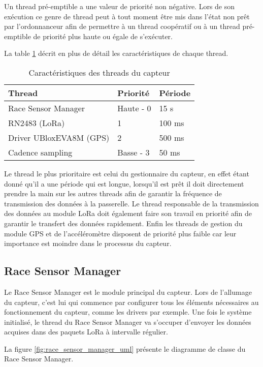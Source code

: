 Un thread pré-emptible a une valeur de priorité non négative. Lors de son exécution ce genre de thread peut à tout moment être mis dans l'état non prêt par l'ordonnanceur afin de permettre à un thread coopératif ou à un thread pré-emptible de priorité plus haute ou égale de s'exécuter. \cite{zephyr_web}

La table \ref{tab:threads_cara} décrit en plus de détail les caractéristiques de chaque thread.

\begin{table}[htb]
\caption{Caractéristiques des threads du capteur}
\label{tab:threads_cara}
\centering
\begin{tabular}{ l l l }
\toprule
Thread & Priorité & Période \\
\midrule
Race Sensor Manager & Haute - 0 & 15 s  \\
RN2483 (LoRa) & 1 & 100 ms  \\
Driver UBloxEVA8M (GPS) & 2 & 500 ms  \\
Cadence sampling & Basse - 3 & 50 ms  \\
\bottomrule 
\end{tabular}
\end{table}

Le thread le plus prioritaire est celui du gestionnaire du capteur, en effet étant donné qu'il a une période qui est longue, lorsqu'il est prêt il doit directement prendre la main sur les autres threads afin de garantir la fréquence de transmission des données à la passerelle.
Le thread responsable de la transmission des données au module LoRa doit également faire son travail en priorité afin de garantir le transfert des données rapidement.
Enfin les threads de gestion du module GPS et de l'accéléromètre disposent de priorité plus faible car leur importance est moindre dans le processus du capteur.

\subsection{Race Sensor Manager}

Le Race Sensor Manager est le module principal du capteur. Lors de l'allumage du capteur, c'est lui qui commence par configurer tous les éléments nécessaires au fonctionnement du capteur, comme les drivers par exemple. Une fois le système initialisé, le thread du Race Sensor Manager va s'occuper d'envoyer les données acquises dans des paquets LoRa à intervalle régulier.

La figure \ref{fig:race_sensor_manager_uml} présente le diagramme de classe du Race Sensor Manager.

